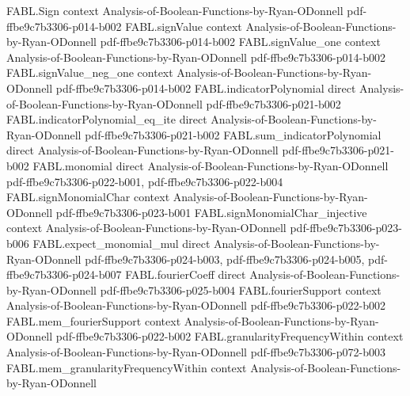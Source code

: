 \begin{theorem}
\label{FABL.fourierCoeff_noiseOperator}
\leanok
{}
\proofstep
  {FABL.Sign}
  {context}
  {Analysis-of-Boolean-Functions-by-Ryan-ODonnell}
  {pdf-ffbe9c7b3306-p014-b002}
\proofstep
  {FABL.signValue}
  {context}
  {Analysis-of-Boolean-Functions-by-Ryan-ODonnell}
  {pdf-ffbe9c7b3306-p014-b002}
\proofstep
  {FABL.signValue_one}
  {context}
  {Analysis-of-Boolean-Functions-by-Ryan-ODonnell}
  {pdf-ffbe9c7b3306-p014-b002}
\proofstep
  {FABL.signValue_neg_one}
  {context}
  {Analysis-of-Boolean-Functions-by-Ryan-ODonnell}
  {pdf-ffbe9c7b3306-p014-b002}
\proofstep
  {FABL.indicatorPolynomial}
  {direct}
  {Analysis-of-Boolean-Functions-by-Ryan-ODonnell}
  {pdf-ffbe9c7b3306-p021-b002}
\proofstep
  {FABL.indicatorPolynomial_eq_ite}
  {direct}
  {Analysis-of-Boolean-Functions-by-Ryan-ODonnell}
  {pdf-ffbe9c7b3306-p021-b002}
\proofstep
  {FABL.sum_indicatorPolynomial}
  {direct}
  {Analysis-of-Boolean-Functions-by-Ryan-ODonnell}
  {pdf-ffbe9c7b3306-p021-b002}
\proofstep
  {FABL.monomial}
  {direct}
  {Analysis-of-Boolean-Functions-by-Ryan-ODonnell}
  {pdf-ffbe9c7b3306-p022-b001,
    pdf-ffbe9c7b3306-p022-b004}
\proofstep
  {FABL.signMonomialChar}
  {context}
  {Analysis-of-Boolean-Functions-by-Ryan-ODonnell}
  {pdf-ffbe9c7b3306-p023-b001}
\proofstep
  {FABL.signMonomialChar_injective}
  {context}
  {Analysis-of-Boolean-Functions-by-Ryan-ODonnell}
  {pdf-ffbe9c7b3306-p023-b006}
\proofstep
  {FABL.expect_monomial_mul}
  {direct}
  {Analysis-of-Boolean-Functions-by-Ryan-ODonnell}
  {pdf-ffbe9c7b3306-p024-b003,
    pdf-ffbe9c7b3306-p024-b005,
    pdf-ffbe9c7b3306-p024-b007}
\proofstep
  {FABL.fourierCoeff}
  {direct}
  {Analysis-of-Boolean-Functions-by-Ryan-ODonnell}
  {pdf-ffbe9c7b3306-p025-b004}
\proofstep
  {FABL.fourierSupport}
  {context}
  {Analysis-of-Boolean-Functions-by-Ryan-ODonnell}
  {pdf-ffbe9c7b3306-p022-b002}
\proofstep
  {FABL.mem_fourierSupport}
  {context}
  {Analysis-of-Boolean-Functions-by-Ryan-ODonnell}
  {pdf-ffbe9c7b3306-p022-b002}
\proofstep
  {FABL.granularityFrequencyWithin}
  {context}
  {Analysis-of-Boolean-Functions-by-Ryan-ODonnell}
  {pdf-ffbe9c7b3306-p072-b003}
\proofstep
  {FABL.mem_granularityFrequencyWithin}
  {context}
  {Analysis-of-Boolean-Functions-by-Ryan-ODonnell}

\end{theorem}
